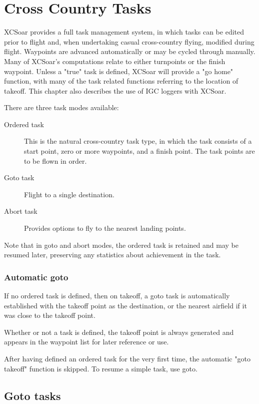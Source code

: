 \chapter{Cross Country Tasks}\label{cha:tasks}

XCSoar provides a full task management system, in which tasks can be
edited prior to flight and, when undertaking casual cross-country
flying, modified during flight.  Waypoints are advanced automatically
or may be cycled through manually. Many of XCSoar's computations relate to
either turnpoints or the finish waypoint.
Unless a "true" task is defined, XCSoar will provide a "go home" function, with
many of the task related functions referring to the location of takeoff.
This chapter also describes the use of IGC loggers with XCSoar.

There are three task modes available:
\begin{description}
\item[Ordered task] This is the natural cross-country task type,
in which the task consists of a start point, zero or more waypoints,
and a finish point.  The task points are to be flown in order.
\item[Goto task] Flight to a single destination.
\item[Abort task] Provides options to fly to the nearest landing points.
\end{description}

Note that in goto and abort modes, the ordered task is retained and may be resumed
later, preserving any statistics about achievement in the task.

\subsection*{Automatic goto}

If no ordered task is defined, then on takeoff, a goto task is automatically
established with the takeoff point as the destination, or the nearest airfield
if it was close to the takeoff point.

Whether or not a task is defined, the takeoff point is always
generated and appears in the waypoint list for later reference or use.

After having defined an ordered task for the very first time, the automatic "goto takeoff" function is skipped. To resume a simple task, use goto.

\section{Goto tasks}

